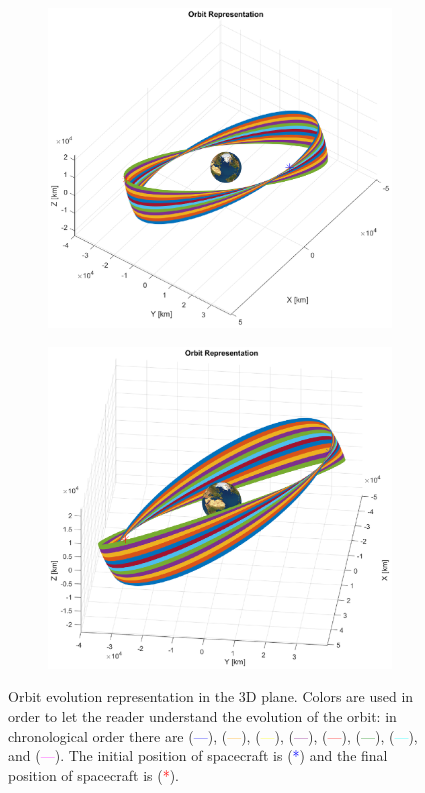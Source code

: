 \documentclass{article}
\newcommand{\reddashedline}{\textcolor{red}{---}}
\newcommand{\orangedashedline}{\textcolor{orange}{---}}
\newcommand{\yellowdashedline}{\textcolor{yellow}{---}}
\newcommand{\greendashedline}{\textcolor{green}{---}}
\newcommand{\bluedashedline}{\textcolor{blue}{---}}
\newcommand{\purpledashedline}{\textcolor{purple}{---}}
\newcommand{\cyandashedline}{\textcolor{cyan}{---}}
\newcommand{\magentadashedline}{\textcolor{magenta}{---}}
\begin{document}
\begin{figure}[H]
	\centering
	\begin{subfigure}[b]{0.5\textwidth}
		\includegraphics[width=\textwidth]{evolutionorbit2.eps}
		\caption{}
		\label{fig:8a}
	\end{subfigure}%
	\begin{subfigure}[b]{0.5\textwidth}
		\includegraphics[width=\textwidth]{evolutionorbit3.eps}
		\caption{}
		\label{fig:8b}
	\end{subfigure}
	\caption{Orbit evolution representation in the 3D plane. Colors are used in order to let the reader understand the evolution of the orbit: in chronological order there are (\bluedashedline), (\orangedashedline), (\yellowdashedline), (\purpledashedline), (\reddashedline), (\greendashedline), (\cyandashedline), and (\magentadashedline). The initial position of spacecraft is (\textcolor{blue}{*}) and the final position of spacecraft is (\textcolor{red}{*}).
	}
\end{figure}
\end{document}
